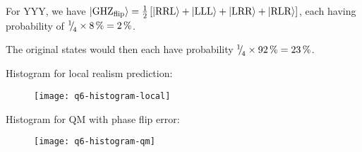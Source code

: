 \begin{parts}
	For YYY, we have $\ket{\textnormal{GHZ}_\textnormal{flip}} = \frac{1}{2}\left[\ket{\textnormal{RRL}} + \ket{\textnormal{LLL}} + \ket{\textnormal{LRR}} + \ket{\textnormal{RLR}}\right]$, each having probability of ${{}^{1}{\mskip -5mu/\mskip -3mu}_{4}}\times\SI{8}{\percent}=\SI{2}{\percent}$.
	
	The original states would then each have probability ${{}^{1}{\mskip -5mu/\mskip -3mu}_{4}}\times\SI{92}{\percent}=\SI{23}{\percent}$.
	
	Histogram for local realism prediction:
	\begin{figure}[H]
		\centering
		\texttt{[image: q6-histogram-local]}
	\end{figure}
	\newpage
	Histogram for QM with phase flip error:
	\begin{figure}[H]
		\centering
		\texttt{[image: q6-histogram-qm]}
	\end{figure}
\end{parts}